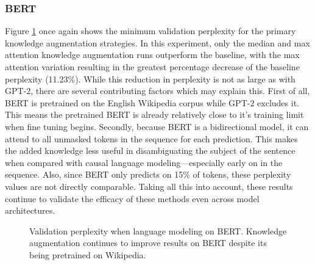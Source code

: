 \documentclass[phd,electronic,oneside,twosidetoc,letterpaper,chaptercenter,parttop,lof]{byumsphd}
\begin{document}
\subsubsection{BERT}

Figure \ref{fig:bert} once again shows the minimum validation perplexity for the primary knowledge augmentation strategies.  In this experiment, only the median and max attention knowledge augmentation runs outperform the baseline, with the max attention variation resulting in the greatest percentage decrease of the baseline perplexity (11.23\%). While this reduction in perplexity is not as large as with GPT-2, there are several contributing factors which may explain this.
First of all, BERT is pretrained on the English Wikipedia corpus \cite{devlin2018bert} while GPT-2 excludes it.
This means the pretrained BERT is already relatively close to it's training limit when fine tuning begins.
Secondly, because BERT is a bidirectional model, it can attend to all unmasked tokens in the sequence for each prediction.
This makes the added knowledge less useful in disambiguating the subject of the sentence when compared with causal language modeling---especially early on in the sequence.
Also, since BERT only predicts on 15\% of tokens, these perplexity values are not directly comparable.
Taking all this into account, these results continue to validate the efficacy of these methods even across model architectures.

\begin{figure}
\centering
{}  
    \caption[Bert validation perplexity]{
        Validation perplexity when language modeling on BERT.
        Knowledge augmentation continues to improve results on BERT despite its being pretrained on Wikipedia.
    }
    \label{fig:bert}
\end{figure}
\end{document}
